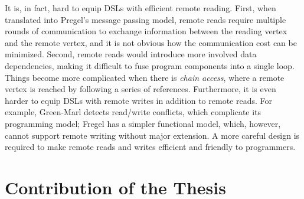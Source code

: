 \documentclass{sokendai_thesis} %
\begin{document}
It is, in fact, hard to equip DSLs with efficient remote reading.
First, when translated into Pregel's message passing model, remote reads require multiple rounds of communication to exchange information between the reading vertex and the remote vertex, and it is not obvious how the communication cost can be minimized.
Second, remote reads would introduce more involved data dependencies, making it difficult to fuse program components into a single loop.
Things become more complicated when there is \emph{chain access}, where a remote vertex is reached by following a series of references.
Furthermore, it is even harder to equip DSLs with remote writes in addition to remote reads.
For example, Green-Marl detects read/write conflicts, which complicate its programming model; Fregel has a simpler functional model, which, however, cannot support remote writing without major extension.
A more careful design is required to make remote reads and writes efficient and friendly to programmers.

\section{Contribution of the Thesis}
\end{document}
